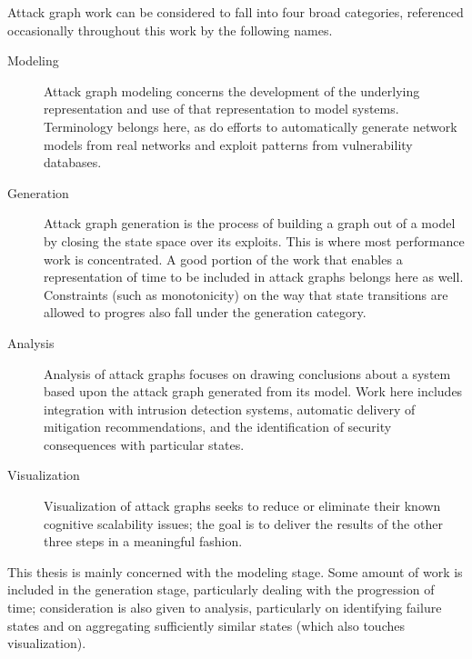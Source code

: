 Attack graph work can be considered to fall into four broad categories, referenced
occasionally throughout this work by the following names.
\begin{description}
\item[Modeling] Attack graph modeling concerns the development of the underlying representation
	and use of that representation to model systems. Terminology belongs here, as do efforts to
	automatically generate network models from real networks and exploit patterns from vulnerability
	databases.
\item[Generation] Attack graph generation is the process of building a graph out of a model by
	closing the state space over its exploits. This is where most performance work is concentrated.
	A good portion of the work that enables a representation of time to be included in attack graphs
	belongs here as well. Constraints (such as monotonicity) on the way that state transitions are 
	allowed to progres also fall under the generation category.
\item[Analysis] Analysis of attack graphs focuses on drawing conclusions about a system based upon
	the attack graph generated from its model. Work here includes integration with intrusion detection
	systems, automatic delivery of mitigation recommendations, and the identification of security
	consequences with particular states.
\item[Visualization] Visualization of attack graphs seeks to reduce or eliminate their
	known cognitive scalability issues; the goal is to deliver the results of the other three
	steps in a meaningful fashion.
\end{description}

This thesis is mainly concerned with the modeling stage. Some amount of work
is included in the generation stage, particularly
dealing with the progression of time; consideration is also given to analysis, 
particularly on identifying failure states and
on aggregating sufficiently similar states (which also touches visualization).




